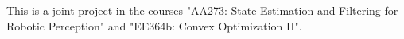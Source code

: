 This is a joint project in the courses "AA273: State Estimation and Filtering for Robotic Perception" and "EE364b: Convex Optimization II".